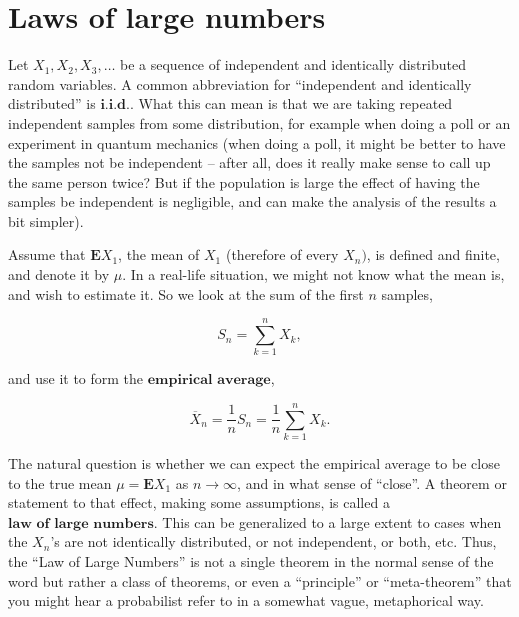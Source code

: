 \chapter{Laws of large numbers}

Let $X_1, X_2, X_3, \ldots$ be a sequence of
independent and identically distributed random
variables. A common abbreviation for ``independent and
identically distributed'' is $\textbf{i.i.d.}$. What
this can mean is that we are taking repeated
independent samples from some distribution, for
example when doing a poll or an experiment in quantum
mechanics (when doing a poll, it might be better to
have the samples not be independent -- after all, does
it really make sense to call up the same person twice?
But if the population is large the effect of having
the samples be independent is negligible, and can make
the analysis of the results a bit simpler).

Assume that $\mathbf{E} X_1$, the mean of $X_1$
(therefore of every $X_n)$, is defined and finite,
and denote it by $\mu$. In a real-life situation, we
might not know what the mean is, and wish to estimate
it. So we look at the sum of the first $n$ samples,

\[
S_n = \sum_{k=1}^n X_k,
\]

\noindent and use it to form the $\textbf{empirical average}$,

\[
\overline{X}_n = \frac1n S_n = \frac{1}{n} \sum_{k=1}^n X_k.
\]

\noindent The natural question is whether we can expect the
empirical average to be close to the true mean
$\mu=\mathbf{E} X_1$ as $n\to\infty$, and in what
sense of ``close''. A theorem or statement to that
effect, making some assumptions, is called a
$\textbf{law of large numbers}$. This can be
generalized to a large extent to cases when the
$X_n$'s are not identically distributed, or not
independent, or both, etc. Thus, the ``Law of Large
Numbers'' is not a single theorem in the normal sense
of the word but rather a class of theorems, or even a
``principle'' or ``meta-theorem'' that you might hear
a probabilist refer to in a somewhat vague,
metaphorical way.



